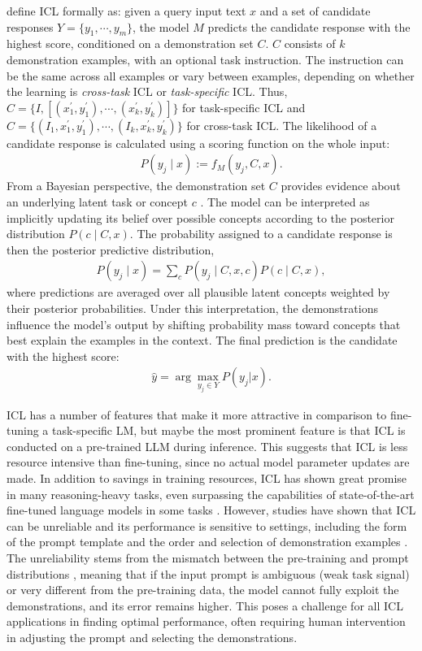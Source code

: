 \documentclass[english, 12pt, a4paper, sci, utf8, a-2b, online]{latex/definitions/aaltothesis}
\begin{document}
\textcite{dong-etal-2024-survey} define ICL formally as: given a query input text $x$ and a set of candidate responses $Y = \{y_1, \cdots, y_m\}$, the model $M$ predicts the candidate response with the highest score, conditioned on a demonstration set $C$. $C$ consists of $k$ demonstration examples, with an optional task instruction. The instruction can be the same across all examples or vary between examples, depending on whether the learning is \textit{cross-task} ICL or \textit{task-specific} ICL. Thus, $C = \{I, [(x_1^\prime, y_1^\prime), \cdots, (x_k^\prime, y_k^\prime)]\}$ for task-specific ICL and $C = \{(I_1, x_1^\prime, y_1^\prime), \cdots, (I_k, x_k^\prime, y_k^\prime)\}$ for cross-task ICL. The likelihood of a candidate response is calculated using a scoring function on the whole input:
\begin{align}
    P(y_j \mid x) := f_M(y_j, C, x).
\end{align}
From a Bayesian perspective, the demonstration set $C$ provides evidence about an underlying latent task or concept $c$ \cite{Xie2021AnEO}. The model can be interpreted as implicitly updating its belief over possible concepts according to the posterior distribution $P(c \mid C, x)$. The probability assigned to a candidate response is then the posterior predictive distribution,
\begin{align}
    P(y_j \mid x) = \sum_cP(y_j \mid C, x, c)P(c \mid C, x),
\end{align}
where predictions are averaged over all plausible latent concepts weighted by their posterior probabilities. Under this interpretation, the demonstrations influence the model's output by shifting probability mass toward concepts that best explain the examples in the context. The final prediction is the candidate with the highest score:
\begin{align}
    \hat{y} = \arg \max_{y_j \in Y}P(y_j|x).
\end{align}

ICL has a number of features that make it more attractive in comparison to fine-tuning a task-specific LM, but maybe the most prominent feature is that ICL is conducted on a pre-trained LLM during inference. This suggests that ICL is less resource intensive than fine-tuning, since no actual model parameter updates are made. In addition to savings in training resources, ICL has shown great promise in many reasoning-heavy tasks, even surpassing the capabilities of state-of-the-art fine-tuned language models in some tasks \cite{brown2020languagemodelsfewshotlearners}. However, studies have shown that ICL can be unreliable and its performance is sensitive to settings, including the form of the prompt template and the order and selection of demonstration examples \cite{wang2024largelanguagemodelslatent}. The unreliability stems from the mismatch between the pre-training and prompt distributions \cite{Xie2021AnEO}, meaning that if the input prompt is ambiguous (weak task signal) or very different from the pre-training data, the model cannot fully exploit the demonstrations, and its error remains higher. This poses a challenge for all ICL applications in finding optimal performance, often requiring human intervention in adjusting the prompt and selecting the demonstrations.
\end{document}
